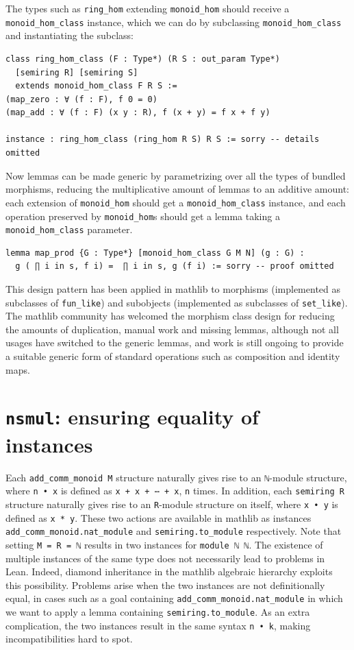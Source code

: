\documentclass[a4paper,UKenglish,cleveref, autoref, thm-restate]{lipics-v2021}
\newcommand{\mathlib}{\textsf{mathlib}\xspace}
\begin{document}
The types such as \lstinline{ring_hom} extending \lstinline{monoid_hom} should receive a \lstinline{monoid_hom_class} instance,
which we can do by subclassing \lstinline{monoid_hom_class} and instantiating the subclass:
\begin{lstlisting}
class ring_hom_class (F : Type*) (R S : out_param Type*)
  [semiring R] [semiring S]
  extends monoid_hom_class F R S :=
(map_zero : ∀ (f : F), f 0 = 0)
(map_add : ∀ (f : F) (x y : R), f (x + y) = f x + f y)

instance : ring_hom_class (ring_hom R S) R S := sorry -- details omitted
\end{lstlisting}

Now lemmas can be made generic by parametrizing over all the types of bundled morphisms,
reducing the multiplicative amount of lemmas to an additive amount:
each extension of \lstinline{monoid_hom} should get a \lstinline{monoid_hom_class} instance,
and each operation preserved by \lstinline{monoid_hom}s should get a lemma taking a \lstinline{monoid_hom_class} parameter.
\begin{lstlisting}
lemma map_prod {G : Type*} [monoid_hom_class G M N] (g : G) :
  g ( ∏ i in s, f i) =  ∏ i in s, g (f i) := sorry -- proof omitted
\end{lstlisting}

This design pattern has been applied in \mathlib to morphisms (implemented as subclasses of \lstinline{fun_like}) and subobjects (implemented as subclasses of \lstinline{set_like}).
The \mathlib community has welcomed the morphism class design for reducing the amounts of duplication, manual work and missing lemmas,
although not all usages have switched to the generic lemmas,
and work is still ongoing to provide a suitable generic form of standard operations such as composition and identity maps.

\section{\lstinline{nsmul}: ensuring equality of instances} \label{sec:nsmul} \label{sec:diamond}

Each \lstinline{add_comm_monoid M} structure naturally gives rise to an \lstinline{ℕ}-module structure,
where \lstinline{n • x} is defined as \lstinline{x + x + ⋯ + x}, \lstinline{n} times.
In addition, each \lstinline{semiring R} structure naturally gives rise to an \lstinline{R}-module structure on itself,
where \lstinline{x • y} is defined as \lstinline{x * y}.
These two actions are available in \mathlib as instances \lstinline{add_comm_monoid.nat_module} and \lstinline{semiring.to_module} respectively.
Note that setting \lstinline{M = R = ℕ} results in two instances for \lstinline{module ℕ ℕ}.
The existence of multiple instances of the same type does not necessarily lead to problems in Lean.
Indeed, diamond inheritance in the \mathlib algebraic hierarchy exploits this possibility.
Problems arise when the two instances are not definitionally equal, in cases such as a goal containing \lstinline{add_comm_monoid.nat_module} in which we want to apply a lemma containing \lstinline{semiring.to_module}.
As an extra complication, the two instances result in the same syntax \lstinline{n • k}, making incompatibilities hard to spot.
\end{document}

